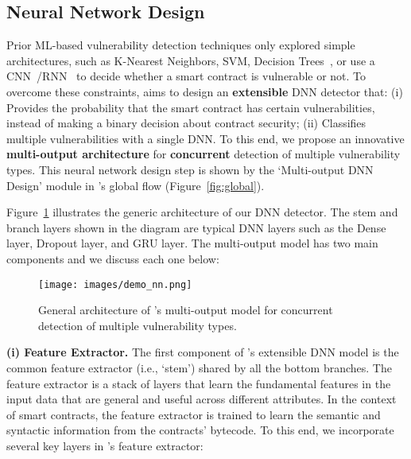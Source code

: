 \subsection{Neural Network Design}
\label{sec:approach:deep-learning}
\vspace{-0.3em}
Prior ML-based vulnerability detection techniques only explored simple architectures, such as K-Nearest Neighbors, SVM, Decision Trees~\cite{rw_contractward}, or use a CNN~\cite{huang2018hunting}/RNN~\cite{rw_lstm} to decide whether a smart contract is vulnerable or not. 
To overcome these constraints, \sys{} aims to design an \textbf{extensible} DNN detector that: (i) Provides the probability that the smart contract has certain vulnerabilities, instead of making a binary decision about contract security; (ii) Classifies multiple vulnerabilities with a single DNN. 
To this end, we propose an innovative \textbf{multi-output architecture} for \textbf{concurrent} detection of multiple vulnerability types. 
This neural network design step is shown by the `Multi-output DNN Design' module in \sys{}'s global flow (Figure~\ref{fig:global}). 

Figure~\ref{fig:demo_nn} illustrates the generic architecture of our DNN detector. {The stem and branch layers shown in the diagram are typical DNN layers such as the Dense layer, Dropout layer, and GRU layer.}
The multi-output model has two main components and we discuss each one below:  

\begin{figure}[ht!]
  \centering
  \texttt{[image: images/demo\_nn.png]}
  \vspace{-0.6em}
  \caption{General architecture of \sys{}'s multi-output model for concurrent detection of multiple vulnerability types. 
  }
  \label{fig:demo_nn}
  \vspace{0.3em}
\end{figure}

\textbf{(i) Feature Extractor.} The first component of \sys{}'s extensible DNN model is the common feature extractor (i.e., `stem') shared by all the bottom branches. 
The feature extractor is a stack of layers that learn the fundamental features in the input data that are general and useful across different attributes. 
In the context of smart contracts, the feature extractor is trained to learn the semantic and syntactic information from the contracts' bytecode. 
To this end, we incorporate several key layers in \sys{}'s feature extractor: 

